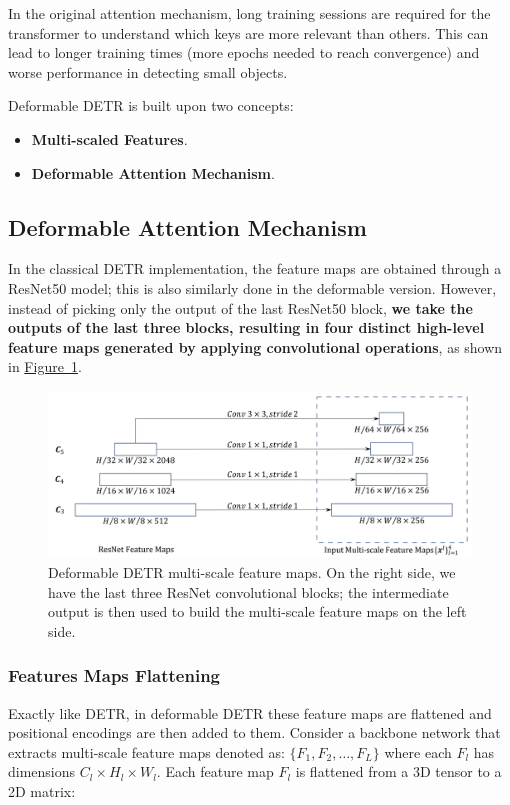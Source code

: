 \documentclass[12pt]{article}
\begin{document}
In the original attention mechanism, long training sessions are required for the transformer to understand which 
keys are more relevant than others. This can lead to longer training times (more epochs needed to reach convergence)
and worse performance in detecting small objects. 

Deformable DETR is built upon two concepts:
\begin{itemize}
    \item \textbf{Multi-scaled Features}.
    \item \textbf{Deformable Attention Mechanism}.
\end{itemize}

\subsection{Deformable Attention Mechanism}
In the classical DETR implementation, the feature maps are obtained through a ResNet50 model; this is also 
similarly done in the deformable version. However, instead of picking only the output of the last 
ResNet50 block, \textbf{we take the outputs of the last three blocks, resulting in four distinct high-level feature maps
generated by applying convolutional operations}, as shown in 
\hyperref[fig:deformable_detr_multi_scale_feature_maps]{Figure~\ref*{fig:deformable_detr_multi_scale_feature_maps}}. 

\begin{figure}
    \centering
    \includegraphics[width=.8\textwidth]{Images/deformable_detr_multi_scale_feature_maps.png}
    \caption{Deformable DETR multi-scale feature maps. On the right side, we have the last three ResNet
    convolutional blocks; the intermediate output is then used to build the multi-scale feature maps on the left 
    side.}
    \label{fig:deformable_detr_multi_scale_feature_maps}
\end{figure}

\subsubsection{Features Maps Flattening}
Exactly like DETR, in deformable DETR these feature maps are flattened and positional encodings are then 
added to them. Consider a backbone network that extracts multi-scale feature maps denoted as:
$\{F_1, F_2, \ldots, F_L\}$ where each $F_l$ has dimensions $C_l \times H_l \times W_l$.
Each feature map $F_l$ is flattened from a 3D tensor to a 2D matrix:
\end{document}
